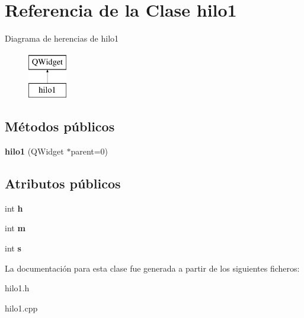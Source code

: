 \hypertarget{classhilo1}{\section{Referencia de la Clase hilo1}
\label{classhilo1}
}
Diagrama de herencias de hilo1\begin{figure}[H]
\begin{center}
\leavevmode
\includegraphics[height=2.000000cm]{classhilo1}
\end{center}
\end{figure}
\subsection*{Métodos públicos}
\begin{DoxyCompactItemize}
\item 
\hypertarget{classhilo1_ac2244f531dad2c953da6cc53f8ad65fa}{{\bfseries hilo1} (Q\-Widget $\ast$parent=0)}\label{classhilo1_ac2244f531dad2c953da6cc53f8ad65fa}

\end{DoxyCompactItemize}
\subsection*{Atributos públicos}
\begin{DoxyCompactItemize}
\item 
\hypertarget{classhilo1_aa69405bbf74d43ea5c5b75f55298cd51}{int {\bfseries h}}\label{classhilo1_aa69405bbf74d43ea5c5b75f55298cd51}

\item 
\hypertarget{classhilo1_a97041e8d73e10802360dfe3d176957f8}{int {\bfseries m}}\label{classhilo1_a97041e8d73e10802360dfe3d176957f8}

\item 
\hypertarget{classhilo1_ac9ad3cf19fd46cbb9f30dfcb5d676ed5}{int {\bfseries s}}\label{classhilo1_ac9ad3cf19fd46cbb9f30dfcb5d676ed5}

\end{DoxyCompactItemize}


La documentación para esta clase fue generada a partir de los siguientes ficheros\-:\begin{DoxyCompactItemize}
\item 
hilo1.\-h\item 
hilo1.\-cpp\end{DoxyCompactItemize}
